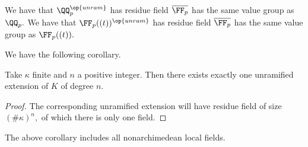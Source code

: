 \begin{example}
	We have that $\QQ_p^{\op{unram}}$ has residue field $\overline{\FF_p}$ has the same value group as $\QQ_p.$ We have that $\FF_p((t))^{\op{unram}}$ has residue field $\overline{\FF_p}$ has the same value group as $\FF_p((t)).$
\end{example}
We have the following corollary.
\begin{corollary}
	Take $\kappa$ finite and $n$ a positive integer. Then there exists exactly one unramified extension of $K$ of degree $n.$
\end{corollary}
\begin{proof}
	The corresponding unramified extension will have residue field of size $(\#\kappa)^n,$ of which there is only one field.
\end{proof}
\begin{example}
	The above corollary includes all nonarchimedean local fields.
\end{example}

